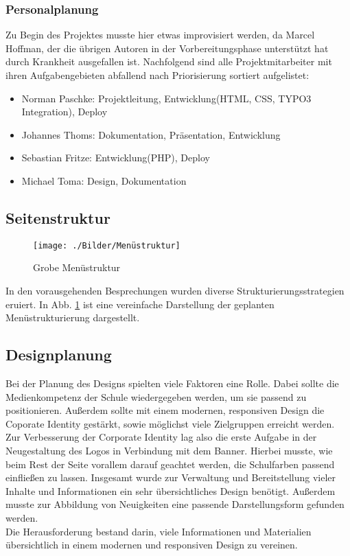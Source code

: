 \subsubsection{Personalplanung}
\label{sec:Personalplanung}
Zu Begin des Projektes musste hier etwas improvisiert werden, da Marcel Hoffman, der die übrigen
Autoren in der Vorbereitungsphase unterstützt hat durch Krankheit ausgefallen ist. Nachfolgend sind
alle Projektmitarbeiter mit ihren Aufgabengebieten abfallend nach Priorisierung sortiert aufgelistet:
\begin{itemize}
\item Norman Paschke: Projektleitung, Entwicklung(HTML, CSS, TYPO3 Integration), Deploy
\item Johannes Thoms: Dokumentation, Präsentation, Entwicklung
\item Sebastian Fritze: Entwicklung(PHP), Deploy
\item Michael Toma: Design, Dokumentation
\end{itemize}

\subsection{Seitenstruktur}
\label{sec:Seitenstruktur}
\begin{figure}[ht]
	\centering
	\texttt{[image: ./Bilder/Menüstruktur]}
	\caption{Grobe Menüstruktur}
	\label{fig:menuStruct}
\end{figure}
In den vorausgehenden Besprechungen wurden diverse Strukturierungsstrategien eruiert. 
In Abb. \ref{fig:menuStruct} ist eine vereinfache Darstellung der geplanten
Menüstrukturierung dargestellt.


\subsection{Designplanung}
\label{sec:Designplanung}
Bei der Planung des Designs spielten viele Faktoren eine Rolle. Dabei sollte die Medienkompetenz 
der Schule wiedergegeben werden, um sie passend zu positionieren. Außerdem sollte mit einem 
modernen, responsiven Design die Coporate Identity gestärkt, sowie möglichst viele Zielgruppen 
erreicht werden.\\
Zur Verbesserung der Corporate Identity lag also die erste Aufgabe in der Neugestaltung des 
Logos in Verbindung mit dem Banner. Hierbei musste, wie beim Rest der Seite vorallem darauf 
geachtet werden, die Schulfarben passend einfließen zu lassen. Insgesamt wurde zur Verwaltung 
und Bereitstellung vieler Inhalte und Informationen ein sehr übersichtliches Design benötigt.
Außerdem musste zur Abbildung von Neuigkeiten eine passende Darstellungsform gefunden 
werden.\\
Die Herausforderung bestand darin, viele Informationen und Materialien übersichtlich in einem
modernen und responsiven Design zu vereinen.   
